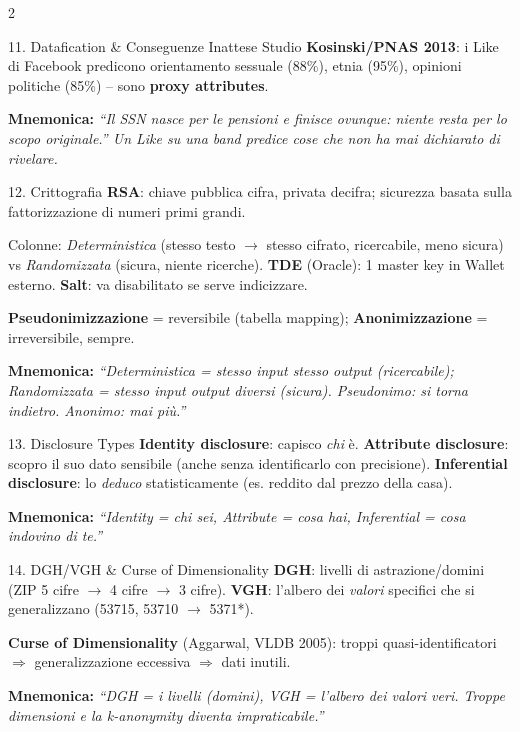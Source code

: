 \documentclass[a4paper,10pt]{article}
\newcommand{\mnem}[1]{{\color{orange!70!black}\textbf{Mnemonica:} \textit{#1}}}
\begin{document}
\begin{multicols}{2}
\begin{area}{11. Datafication \& Conseguenze Inattese}
Studio \textbf{Kosinski/PNAS 2013}: i Like di Facebook predicono orientamento sessuale (88\%), etnia (95\%), opinioni politiche (85\%) -- sono \textbf{proxy attributes}.

\mnem{``Il SSN nasce per le pensioni e finisce ovunque: niente resta per lo scopo originale.'' Un Like su una band predice cose che non ha mai dichiarato di rivelare.}
\end{area}

\begin{area}{12. Crittografia}
\textbf{RSA}: chiave pubblica cifra, privata decifra; sicurezza basata sulla fattorizzazione di numeri primi grandi.

Colonne: \emph{Deterministica} (stesso testo $\to$ stesso cifrato, ricercabile, meno sicura) vs \emph{Randomizzata} (sicura, niente ricerche). \textbf{TDE} (Oracle): 1 master key in Wallet esterno. \textbf{Salt}: va disabilitato se serve indicizzare.

\textbf{Pseudonimizzazione} = reversibile (tabella mapping); \textbf{Anonimizzazione} = irreversibile, sempre.

\mnem{``Deterministica = stesso input stesso output (ricercabile); Randomizzata = stesso input output diversi (sicura). Pseudonimo: si torna indietro. Anonimo: mai più.''}
\end{area}

\begin{area}{13. Disclosure Types}
\textbf{Identity disclosure}: capisco \emph{chi} \`{e}. \textbf{Attribute disclosure}: scopro il suo dato sensibile (anche senza identificarlo con precisione). \textbf{Inferential disclosure}: lo \emph{deduco} statisticamente (es. reddito dal prezzo della casa).

\mnem{``Identity = chi sei, Attribute = cosa hai, Inferential = cosa indovino di te.''}
\end{area}

\begin{area}{14. DGH/VGH \& Curse of Dimensionality}
\textbf{DGH}: livelli di astrazione/domini (ZIP 5 cifre $\to$ 4 cifre $\to$ 3 cifre). \textbf{VGH}: l'albero dei \emph{valori} specifici che si generalizzano (53715, 53710 $\to$ 5371*).

\textbf{Curse of Dimensionality} (Aggarwal, VLDB 2005): troppi quasi-identificatori $\Rightarrow$ generalizzazione eccessiva $\Rightarrow$ dati inutili.

\mnem{``DGH = i livelli (domini), VGH = l'albero dei valori veri. Troppe dimensioni e la k-anonymity diventa impraticabile.''}
\end{area}


\end{multicols}
\end{document}
